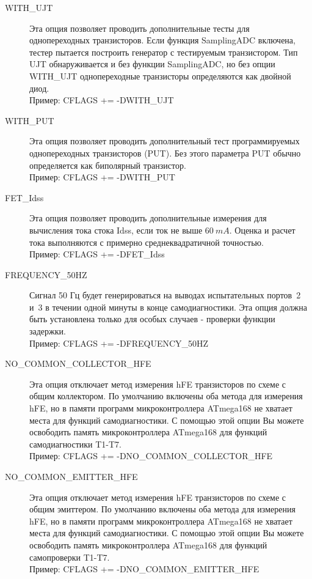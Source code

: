 \begin{description}
  \item[WITH\_UJT] Эта опция позволяет проводить дополнительные тесты для однопереходных транзисторов.
Если функция SamplingADC включена, тестер пытается построить генератор с тестируемым транзистором.
Тип UJT обнаруживается и без функции SamplingADC, но 
без опции WITH\_UJT однопереходные транзисторы определяются как двойной диод.\\
Пример: CFLAGS += -DWITH\_UJT

  \item[WITH\_PUT] Эта опция позволяет проводить дополнительный тест программируемых однопереходных
транзисторов (PUT). Без этого параметра PUT обычно определяется как биполярный транзистор.\\
Пример: CFLAGS += -DWITH\_PUT

  \item[FET\_Idss]
Эта опция позволяет проводить дополнительные измерения для вычисления тока стока Idss, если ток
не выше \(60~mA\). Оценка и расчет тока выполняются с примерно среднеквадратичной точностью.\\
Пример: CFLAGS += -DFET\_Idss

  \item[FREQUENCY\_50HZ] Сигнал 50 Гц будет генерироваться на выводах испытательных портов~2 и~3 в течении 
одной минуты в конце самодиагностики.
Эта опция должна быть установлена только для особых случаев - проверки функции задержки.\\
Пример: CFLAGS += -DFREQUENCY\_50HZ

  \item[NO\_COMMON\_COLLECTOR\_HFE] Эта опция отключает метод измерения hFE транзисторов по схеме с общим 
коллектором. По умолчанию включены оба метода для измерения hFE, но в памяти программ микроконтроллера ATmega168 
не хватает места для функций самодиагностики. С помощью этой опции Вы можете освободить память микроконтроллера 
ATmega168 для функций самодиагностики T1-T7.\\
Пример: CFLAGS += -DNO\_COMMON\_COLLECTOR\_HFE

  \item[NO\_COMMON\_EMITTER\_HFE] Эта опция отключает метод измерения hFE транзисторов по схеме с общим эмиттером. 
По умолчанию включены оба метода для измерения hFE, но в памяти программ микроконтроллера ATmega168 не хватает 
места для функций самодиагностики. С помощью этой опции Вы можете освободить память микроконтроллера ATmega168 для 
функций самопроверки T1-T7.\\
Пример: CFLAGS += -DNO\_COMMON\_EMITTER\_HFE


\end{description}
